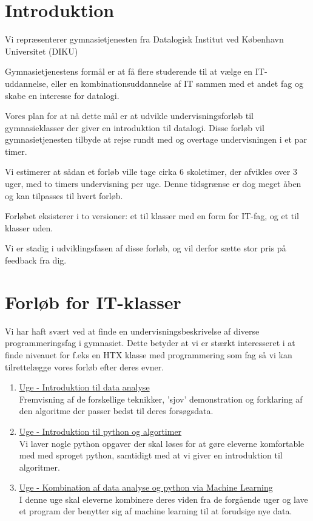\documentclass[11pt]{article}
\begin{document}
    \newpage                %
    \setcounter{page}{1}    %

\section{Introduktion}
    Vi repræsenterer gymnasietjenesten fra
    Datalogisk Institut ved København Universitet (DIKU)

    Gymnasietjenestens formål er at få flere studerende til at vælge en
    IT-uddannelse, eller en kombinationsuddannelse af IT sammen med et andet fag
    og skabe en interesse for datalogi.

    Vores plan for at nå dette mål er at udvikle undervisningsforløb til
    gymnasieklasser der giver en introduktion til datalogi. Disse forløb vil
    gymnasietjenesten tilbyde at rejse rundt med og overtage undervisningen i et
    par timer.

    Vi estimerer at sådan et forløb ville tage cirka 6 skoletimer, der afvikles over 3 uger,
    med to timers undervisning per uge. Denne tidsgrænse er dog meget åben og kan tilpasses
    til hvert forløb.

    Forløbet eksisterer i to versioner: et til klasser med en form for IT-fag,
    og et til klasser uden.

    Vi er stadig i udviklingsfasen af disse forløb, og vil derfor sætte stor
    pris på feedback fra dig.

\section{Forløb for IT-klasser}
    Vi har haft svært ved at finde en undervisningsbeskrivelse af diverse
    programmeringsfag i gymnasiet. Dette betyder at vi er stærkt interesseret i
    at finde niveauet for f.eks en HTX klasse med programmering som fag så vi
    kan tilrettelægge vores forløb efter deres evner.
    \begin{enumerate}
        \item \underline{Uge - Introduktion til data analyse} ~ \\
        Fremvisning af de forskellige teknikker, 'sjov' demonstration og
        forklaring af den algoritme der passer bedst til deres forsøgsdata.
        \item \underline{Uge - Introduktion til python og algortimer} ~ \\
        Vi laver nogle python opgaver der skal løses for at gøre eleverne komfortable med
        med sproget python, samtidigt med at vi giver en introduktion til algoritmer.
        \item \underline{Uge - Kombination af data analyse og python via
        Machine Learning} ~ \\
        I denne uge skal eleverne kombinere deres viden fra de forgående uger
        og lave et program der benytter sig af machine learning til at forudsige
        nye data.



    \end{enumerate}
\end{document}
